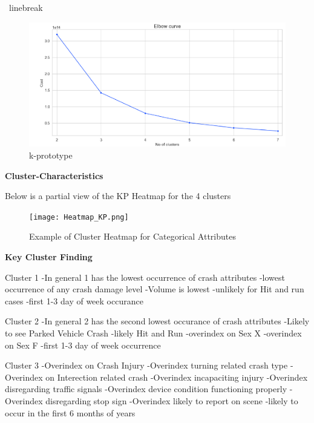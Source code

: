 \documentclass[conference]{IEEEtran}
\begin{document}
\begin{center}
\ linebreak
 \begin{figure}[!h]
	\includegraphics[width=\linewidth]{KPrototype_Elbow.png}
	\caption{k-prototype}
	\label{fig: kprototype elbow chart}
 \end{figure}

\textbf{Cluster-Characteristics} \linebreak

Below is a partial view of the KP Heatmap for the 4 clusters

\begin{figure}[!h]
	\texttt{[image: Heatmap\_KP.png]}
	\caption{Example of Cluster Heatmap for Categorical Attributes }
	\label{fig: Cluster Heatmap for Categorical Attributes (4 Clusters)}
\end{figure}

\begin{center} 
	\textbf{Key Cluster Finding} 
	\end{center}


Cluster 1 \linebreak
-In general 1 has the lowest occurrence of crash attributes 
-lowest occurrence of any crash damage level 
-Volume is lowest 
-unlikely for Hit and run cases 
-first 1-3 day of week occurance 

Cluster 2 \linebreak
-In general 2 has the second lowest occurance of crash attributes
-Likely to see Parked Vehicle Crash
-likely Hit and Run
-overindex on Sex X
-overindex on Sex F
-first 1-3 day of week occurrence

Cluster 3 \linebreak
-Overindex on Crash Injury
-Overindex turning related crash type
-Overindex on Interection related crash
-Overindex incapaciting injury
-Overindex disregarding traffic signals
-Overindex device condition functioning properly
-Overindex disregarding stop sign
-Overindex likely to report on scene
-likely to occur in the first 6 months of years


\end{center}
\end{document}
